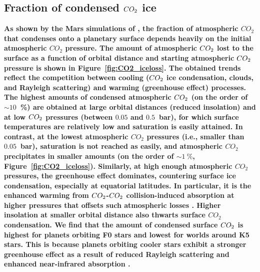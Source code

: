 \documentclass[fleqn,usenatbib]{mnras}
\providecommand{\DIFadd}[1]{{\bf #1}} %
\begin{document}
\subsection{\DIFadd{Fraction of condensed $CO_{\rm 2}$ ice}}
\DIFadd{As shown by the Mars simulations of \citet{Soto2015}, the fraction of atmospheric $CO_{\mathrm{2}}$ that condenses onto a planetary surface depends heavily on the initial atmospheric $CO_{\mathrm{2}}$ pressure.  The amount of atmospheric $CO_{\rm 2}$ lost to the surface as a function of orbital distance and starting atmospheric $CO_{\rm 2}$ pressure is shown in Figure~\ref{fig:CO2_iceloss}.  The obtained trends reflect the competition between cooling ($CO_{\rm 2}$ ice condensation, clouds, and Rayleigh scattering) and warming (greenhouse effect) processes.  The highest amounts of condensed atmospheric $CO_{\rm 2}$ (on the order of $\sim 10$~\%) are obtained at large orbital distances (reduced insolation) and at low $CO_{\rm 2}$ pressures (between $0.05$ and $0.5$~bar), for which surface temperatures are relatively low and saturation is easily attained. In contrast, at the lowest atmospheric $CO_{\mathrm{2}}$ pressures (i.e., smaller than $0.05$~bar), saturation is not reached as easily, and atmospheric $CO_{\mathrm{2}}$ precipitates in smaller amounts (on the order of $\sim 1~\%$, Figure~\ref{fig:CO2_iceloss}). Similarly, at high enough atmospheric $CO_{\mathrm{2}}$ pressures, 
the greenhouse effect dominates, countering surface ice condensation, especially at equatorial latitudes. In particular, it is the enhanced warming from $CO_{\rm 2}$-$CO_{\rm 2}$ collision-induced absorption at higher pressures that offsets such atmospheric losses \citep{wordsworth2010, ramirez2014}. Higher insolation at smaller orbital distance also thwarts surface $CO_{\mathrm{2}}$ condensation. We find that the amount of condensed surface $CO_{\rm 2}$ is highest for planets orbiting F0 stars and lowest for worlds around K5 stars. This is because planets orbiting cooler stars exhibit a stronger greenhouse effect as a result of reduced Rayleigh scattering and enhanced near-infrared absorption \citep{kasting1993}.
}
\end{document}
